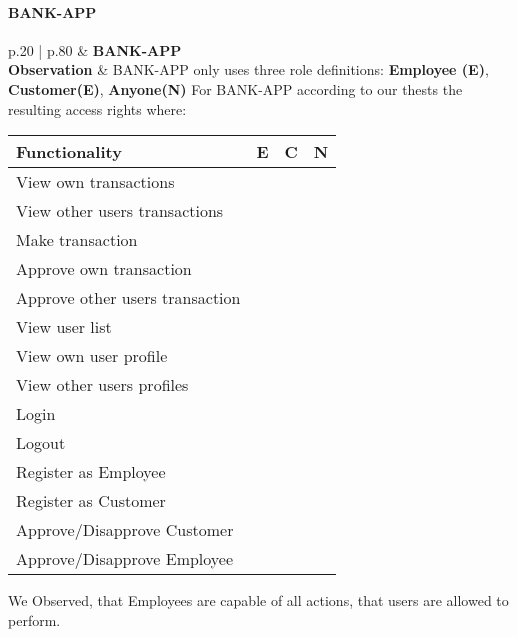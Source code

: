 \paragraph{BANK-APP} \mbox{}
\begin{longtable*}{p{.20\textwidth} | p{.80\textwidth}}
    \hline
    & \textbf{BANK-APP} \\ 
    \hline
    \textbf{Observation} &
    	BANK-APP only uses three role definitions: \textbf{Employee (E)}, \textbf{Customer(E)}, \textbf{Anyone(N)}
		For BANK-APP according to our thests the resulting access rights where:
		\begin{center}
		    \begin{tabular}{ | l | l | l | l |}
		    \hline
		    \textbf{Functionality} 			& \textbf{E} & \textbf{C} & \textbf{N} \\ \hline
		    View own transactions 			& \cmark  	& \cmark 	& \xmark \\ \hline
		    View other users transactions 	& \cmark 	& \xmark	& \xmark \\ \hline
		    Make transaction 				& \cmark 	& \cmark 	& \xmark \\ \hline
		    Approve own transaction 		& \cmark 	& \xmark 	& \xmark \\ \hline
		    Approve other users transaction & \cmark 	& \xmark 	& \xmark \\ \hline
		    View user list 					& \cmark 	& \xmark 	& \xmark \\ \hline
		    View own user profile 			& \cmark 	& \cmark 	& \xmark \\ \hline
		    View other users profiles 		& \cmark 	& \xmark 	& \xmark \\ \hline
		    Login 							& \cmark 	& \cmark 	& \xmark \\ \hline
		    Logout 							& \cmark 	& \cmark 	& \xmark \\ \hline
		    Register as Employee 			& \cmark 	& \cmark 	& \cmark \\ \hline
		    Register as Customer 			& \cmark 	& \cmark 	& \cmark \\ \hline
		    Approve/Disapprove Customer 	& \cmark 	& \xmark 	& \xmark \\ \hline
		    Approve/Disapprove Employee 	& \cmark 	& \xmark 	& \xmark \\ \hline
		    \end{tabular}
		\end{center}
		We Observed, that Employees are capable of all actions, that users are allowed to perform.

\end{longtable*}

